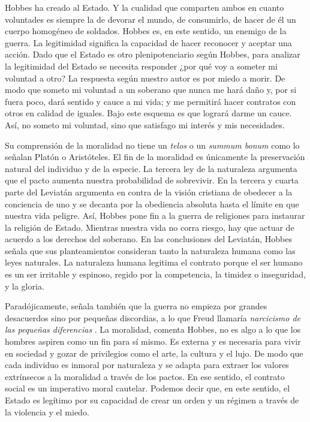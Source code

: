 Hobbes ha creado al Estado. Y la cualidad que comparten ambos en cuanto voluntades es siempre la de devorar el mundo, de consumirlo, de hacer de él un cuerpo homogéneo de soldados. Hobbes es, en este sentido, un enemigo de la guerra. La legitimidad significa la capacidad de hacer reconocer y aceptar una acción. Dado que el Estado es otro plenipotenciario según Hobbes, para analizar la legitimidad del Estado se necesita responder ¿por qué voy a someter mi voluntad a otro? La respuesta según nuestro autor es por miedo a morir. De modo que someto mi voluntad a un soberano que nunca me hará daño y, por si fuera poco, dará sentido y cauce a mi vida; y me permitirá hacer contratos con otros en calidad de iguales. Bajo este esquema es que logrará darme un cauce. Así, no someto mi voluntad, sino que satisfago mi interés y mis necesidades.

Su comprensión de la moralidad no tiene un \emph{telos} o un \emph{summum bonum} como lo señalan Platón o Aristóteles. El fin de la moralidad es únicamente la preservación natural del individuo y de la especie. La tercera ley de la naturaleza argumenta que el pacto aumenta nuestra probabilidad de sobrevivir. En la tercera y cuarta parte del Leviatán argumenta en contra de la visión cristiana de obedecer a la conciencia de uno y se decanta por la obediencia absoluta hasta el límite en que nuestra vida peligre. Así, Hobbes pone fin a la guerra de religiones para instaurar la religión de Estado. Mientras nuestra vida no corra riesgo, hay que actuar de acuerdo a los derechos del soberano. En las conclusiones del Leviatán, Hobbes señala que sus planteamientos consideran tanto la naturaleza humana como las leyes naturales. La naturaleza humana legitima el contrato porque el ser humano es un ser irritable y espinoso, regido por la competencia, la timidez o inseguridad, y la gloria.

Paradójicamente, señala también que la guerra no empieza por grandes desacuerdos sino por pequeñas discordias, a lo que Freud llamaría \emph{narcicismo de las pequeñas diferencias} \autocite{freudTresEnsayosTeoria2017}. La moralidad, comenta Hobbes, no es algo a lo que los hombres aspiren como un fin para sí mismo. Es externa y es necesaria para vivir en sociedad y gozar de privilegios como el arte, la cultura y el lujo. De modo que cada individuo es inmoral por naturaleza y se adapta para extraer los valores extrínsecos a la moralidad a través de los pactos. En ese sentido, el contrato social es un imperativo moral cautelar. Podemos decir que, en este sentido, el Estado es legítimo por su capacidad de crear un orden y un régimen a través de la violencia y el miedo.

